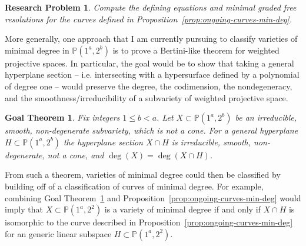 \documentclass[11pt,reqno]{amsart}
\newtheorem{goalTheorem}[lemma]{Goal Theorem}
\newtheorem{problem}[lemma]{Research Problem}
\theoremstyle{remark}
\newtheorem{example}[lemma]{Example}
\newcommand{\C}{\mathbb{C}}
\renewcommand{\P}{\mathbb{P}}
\newcommand{\V}{\mathbb{V}}
\newcommand{\juliette}[1]{{\color{red} \sf $\spadesuit\spadesuit\spadesuit$ Juliette: [#1]}}
\begin{document}
\begin{problem}
	Compute the defining equations and minimal graded free resolutions for the curves defined in Proposition~\ref{prop:ongoing-curves-min-deg}. 
\end{problem}

More generally, one approach that I am currently pursuing to classify varieties of minimal degree in $\P(1^a,2^b)$ is to prove a Bertini-like theorem for weighted projective spaces. In particular, the goal would be to show that taking a general hyperplane section -- i.e. intersecting with a hypersurface defined by a polynomial of degree one -- would preserve the degree, the codimension, the nondegeneracy, and the smoothness/irreducibility of a subvariety of weighted projective space. 
 
 
 \begin{goalTheorem}\label{prob:weighted-bertini}
 	Fix integers $1\leq b < a$. Let $X\subset \P(1^a,2^b)$ be an irreducible, smooth, non-degenerate subvariety, which is not a cone. For a general hyperplane $H\subset \P(1^a,2^b)$ the hyperplane section $X\cap H$ is irreducible, smooth,  non-degenerate, not a cone, and  $\deg(X) = \deg(X\cap H)$. 
 \end{goalTheorem}
 

	From such a theorem, varieties of minimal degree could then be classified by building off of a classification of curves of minimal degree. For example, combining Goal Theorem~\ref{prob:weighted-bertini} and Proposition~\ref{prop:ongoing-curves-min-deg} would imply that $X\subset \P(1^{a},2^2)$ is a variety of minimal degree if and only if $X\cap H$ is isomorphic to the curve described in Proposition~\ref{prop:ongoing-curves-min-deg} for an generic linear subspace $H \subset \P(1^{a},2^2)$.

%
%
\end{document}
